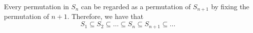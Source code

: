 \begin{note}[Convention]
 Every permutation in $S_n$ can be regarded as a permutation of $S_{n + 1}$ by fixing the permutation of $n + 1$. Therefore, we have that
 \begin{equation*}
   S_1 \subseteq S_2 \subseteq \hdots \subseteq S_n \subseteq S_{n + 1} \subseteq \hdots
 \end{equation*}
\end{note}




